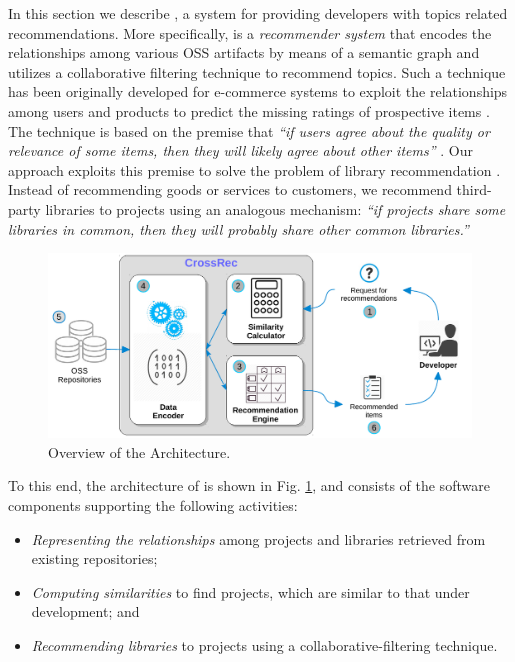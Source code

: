 In this section we describe \CR, a system for providing developers with \GH topics related recommendations. More specifically, \CR is a \emph{recommender system} \cite{Aggarwal2016} that encodes the relationships among various OSS artifacts by means of a semantic graph and utilizes a collaborative filtering technique \cite{Schafer:2007:CFR:1768197.1768208} to recommend \GH topics. Such a technique has been originally developed for e-commerce systems to exploit the relationships among users and products to predict the missing ratings of prospective items \cite{Linden:2003:ARI:642462.642471}. The technique is based on the premise that \emph{``if users agree about the quality or relevance of some items, then they will likely agree about other items''} \cite{Schafer:2007:CFR:1768197.1768208}. Our approach exploits this premise to solve the problem of library recommendation \cite{Robillard:2014:RSS:2631387}. Instead of recommending goods or services to customers, we recommend third-party libraries to projects using an analogous mechanism: \emph{``if projects share some libraries in common, then they will probably share other common libraries.''} 

\begin{figure}[t!]
	\centering
	\includegraphics[width=\linewidth]{figs/CrossRec.pdf}
	\caption{Overview of the \CR Architecture.}%
	\label{fig:CrossRecArchitecture}
\end{figure}

%
To this end, the architecture of \CR is shown in Fig. \ref{fig:CrossRecArchitecture}, and consists of the software components supporting the following activities:

\begin{itemize}
	\item \textit{Representing the relationships} among projects and libraries retrieved from 
	existing repositories;
	\item \textit{Computing similarities} to find projects, which are similar to that under 
	development; and
	\item \textit{Recommending libraries} to projects using a collaborative-filtering technique.
\end{itemize}


